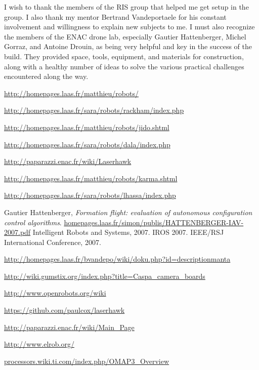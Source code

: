 \documentclass[a4paper,11pt]{report}
\begin{document}
I wish to thank the members of the RIS group that helped me get setup in the group. I also thank my mentor Bertrand Vandeportaele for his constant involvement and willingness to explain new subjects to me. I must also recognize the members of the ENAC drone lab, especially Gautier Hattenberger, Michel Gorraz, and Antoine Drouin, as being very helpful and key in the success of the build. They provided space, tools, equipment, and materials for construction, along with a healthy number of ideas to solve the various practical challenges encountered along the way.

\begin{thebibliography}{9}

  \url{http://homepages.laas.fr/matthieu/robots/}


  \url{http://homepages.laas.fr/sara/robots/rackham/index.php}

  \url{http://homepages.laas.fr/matthieu/robots/jido.shtml}

  \url{http://homepages.laas.fr/sara/robots/dala/index.php}

  \url{http://paparazzi.enac.fr/wiki/Laserhawk}

  \url{http://homepages.laas.fr/matthieu/robots/karma.shtml}

  \url{http://homepages.laas.fr/sara/robots/lhassa/index.php}

  Gautier Hattenberger,
  \emph{Formation flight: evaluation of autonomous configuration control algorithms}.
  \url{homepages.laas.fr/simon/publis/HATTENBERGER-IAV-2007.pdf}
  Intelligent Robots and Systems, 2007. IROS 2007. IEEE/RSJ International Conference, 
  2007.

  \url{http://homepages.laas.fr/bvandepo/wiki/doku.php?id=descriptionmanta}

  \url{http://wiki.gumstix.org/index.php?title=Caspa_camera_boards}

  \url{http://www.openrobots.org/wiki}

  \url{https://github.com/paulcox/laserhawk}

  \url{http://paparazzi.enac.fr/wiki/Main_Page}

  \url{http://www.elrob.org/}

  \url{processors.wiki.ti.com/index.php/OMAP3_Overview}


\end{thebibliography}
\end{document}
